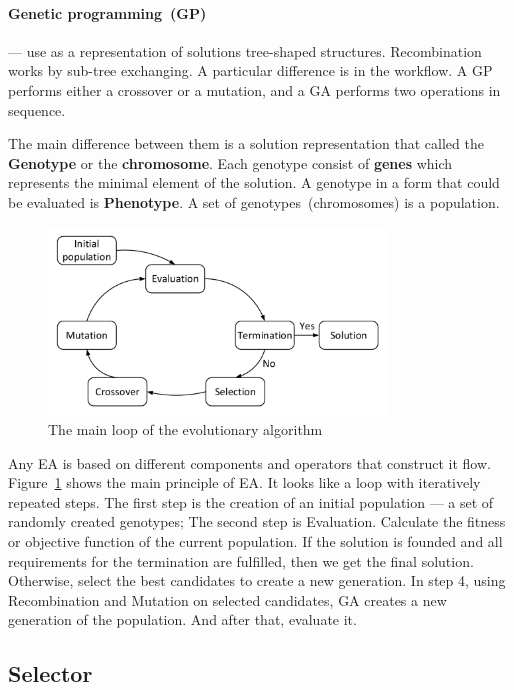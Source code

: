 \paragraph{Genetic programming~(GP)} — use as a representation of solutions tree-shaped structures. Recombination works by sub-tree exchanging. A particular difference is in the workflow. A GP performs either a crossover or a mutation, and a GA performs two operations in sequence.

The main difference between them is a solution representation that called the \textbf{Genotype} or the \textbf{chromosome}. Each genotype consist of \textbf{genes} which represents the minimal element of the solution. A genotype in a form that could be evaluated is \textbf{Phenotype}. A set of genotypes~(chromosomes) is a population.

\begin{figure}
	\centering
	\includegraphics[width=0.8\textwidth]{images/GeneticLoop.pdf}
	\caption[The main loop of the evolutionary algorithm]{The main loop of the evolutionary algorithm}
	\label{fig:GeneticLoop}
\end{figure}

Any EA is based on different components and operators that construct it flow.
Figure~\ref{fig:GeneticLoop} shows the main principle of EA. It looks like a loop with iteratively repeated steps.
The first step is the creation of an initial population — a set of randomly created genotypes;
The second step is Evaluation. Calculate the fitness or objective function of the current population.
If the solution is founded and all requirements for the termination are fulfilled, then we get the final solution. Otherwise, select the best candidates to create a new generation.
In step 4, using Recombination and Mutation on selected candidates, GA creates a new generation of the population. And after that, evaluate it.

\subsection{Selector}\label{sec:GeneticAlgorithm:Selector}

